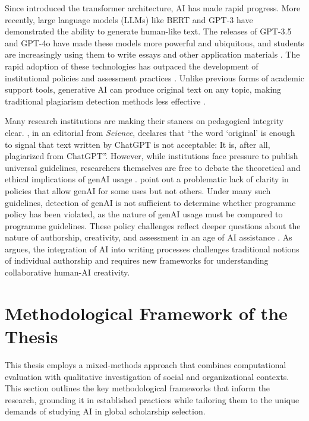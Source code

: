 Since \textcite{ashish_vaswani_attention_2017} introduced the transformer architecture, AI has made rapid progress. More recently, large language models (LLMs) like BERT \cite{jacob_devlin_bert_2018} and GPT-3 \cite{brown_language_2020} have demonstrated the ability to generate human-like text. The releases of GPT-3.5 and GPT-4o have made these models more powerful and ubiquitous, and students are increasingly using them to write essays and other application materials \cite{openai_gpt-4_2023,dehouche_plagiarism_2021}. The rapid adoption of these technologies has outpaced the development of institutional policies and assessment practices \cite{cotton2023chatting}. Unlike previous forms of academic support tools, generative AI can produce original text on any topic, making traditional plagiarism detection methods less effective \cite{mitchell_detectgpt_2023}.

Many research institutions are making their stances on pedagogical integrity clear. \textcite{h_holden_thorp_chatgpt_2023}, in an editorial from \emph{Science}, declares that ``the word `original' is enough to signal that text written by ChatGPT is not acceptable: It is, after all, plagiarized from ChatGPT''. However, while institutions face pressure to publish universal guidelines, researchers themselves are free to debate the theoretical and ethical implications of genAI usage \cite{lav_r_varshney_limits_2020,h_holden_thorp_chatgpt_2023,yu_huang_reflection_2023}. \textcite{MikePerkins_JasperRoe_2023} point out a problematic lack of clarity in policies that allow genAI for some uses but not others. Under many such guidelines, detection of genAI is not sufficient to determine whether programme policy has been violated, as the nature of genAI usage must be compared to programme guidelines. These policy challenges reflect deeper questions about the nature of authorship, creativity, and assessment in an age of AI assistance \cite{floridi2023ai}. As \textcite{beck2023human} argues, the integration of AI into writing processes challenges traditional notions of individual authorship and requires new frameworks for understanding collaborative human-AI creativity.

\section{Methodological Framework of the Thesis}\label{sec:context_methodology}

This thesis employs a mixed-methods approach that combines computational evaluation with qualitative investigation of social and organizational contexts. This section outlines the key methodological frameworks that inform the research, grounding it in established practices while tailoring them to the unique demands of studying AI in global scholarship selection.

